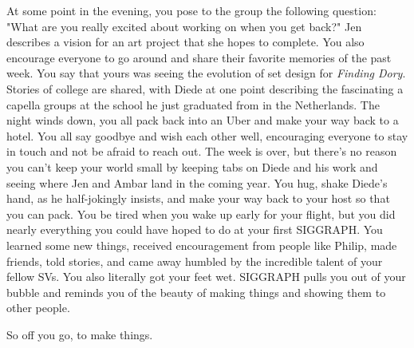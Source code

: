 \documentclass[../main.tex]{subfiles}
\begin{document}
At some point in the evening, you pose to the group the following question: "What are you really excited about working on when you get back?" Jen describes a vision for an art project that she hopes to complete. You also encourage everyone to go around and share their favorite memories of the past week. You say that yours was seeing the evolution of set design for \textit{Finding Dory}. Stories of college are shared, with Diede at one point describing the fascinating a capella groups at the school he just graduated from in the Netherlands. The night winds down, you all pack back into an Uber and make your way back to a hotel. You all say goodbye and wish each other well, encouraging everyone to stay in touch and not be afraid to reach out. The week is over, but there's no reason you can't keep your world small by keeping tabs on Diede and his work and seeing where Jen and Ambar land in the coming year. You hug, shake Diede's hand, as he half-jokingly insists, and make your way back to your host so that you can pack. You be tired when you wake up early for your flight,  but you did nearly everything you could have hoped to do at your first SIGGRAPH. You learned some new things, received encouragement from people like Philip, made friends, told stories, and came away humbled by the incredible talent of your fellow SVs. You also literally got your feet wet. SIGGRAPH pulls you out of your bubble and reminds you of the beauty of making things and showing them to other people. 

\bigskip

So off you go, to make things.
\end{document}
